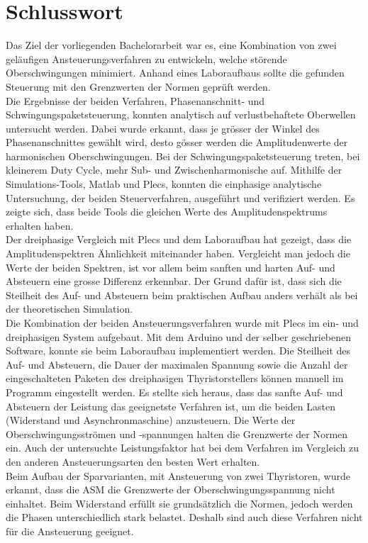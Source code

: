 \section{Schlusswort}
Das Ziel der vorliegenden Bachelorarbeit war es, eine Kombination von zwei geläufigen Ansteuerungsverfahren zu entwickeln, welche störende Oberschwingungen minimiert. Anhand eines Laboraufbaus sollte die gefunden Steuerung mit den Grenzwerten der Normen geprüft werden.\\ 
Die Ergebnisse der beiden Verfahren, Phasenanschnitt- und Schwingungspaketsteuerung, konnten analytisch auf verlustbehaftete Oberwellen untersucht werden. Dabei wurde erkannt, dass je grösser der Winkel des Phasenanschnittes gewählt wird, desto gösser werden die Amplitudenwerte der harmonischen Oberschwingungen. Bei der Schwingungspaketsteuerung treten, bei kleinerem Duty Cycle, mehr Sub- und Zwischenharmonische auf. Mithilfe der Simulations-Tools, Matlab und Plecs, konnten die einphasige analytische Untersuchung, der beiden Steuerverfahren, ausgeführt und verifiziert werden. Es zeigte sich, dass beide Tools die gleichen Werte des Amplitudenspektrums erhalten haben.\\ 
Der dreiphasige Vergleich mit Plecs und dem Laboraufbau hat gezeigt, dass die Amplitudenspektren Ähnlichkeit miteinander haben. Vergleicht man jedoch die Werte der beiden Spektren, ist vor allem beim sanften und harten Auf- und Absteuern eine grosse Differenz erkennbar. Der Grund dafür ist, dass sich die Steilheit des Auf- und Absteuern beim praktischen Aufbau anders verhält als bei der theoretischen Simulation.\\
Die Kombination der beiden Ansteuerungsverfahren wurde mit Plecs im ein- und dreiphasigen System aufgebaut. Mit dem Arduino und der selber geschriebenen Software, konnte sie beim Laboraufbau implementiert werden. Die Steilheit des Auf- und Absteuern, die Dauer der maximalen Spannung sowie die Anzahl der eingeschalteten Paketen des dreiphasigen Thyristorstellers können manuell im Programm eingestellt werden. Es stellte sich heraus, dass das sanfte Auf- und Absteuern der Leistung das geeignetste Verfahren ist, um die beiden Lasten (Widerstand und Asynchronmaschine) anzusteuern. Die Werte der Oberschwingungsströmen und -spannungen halten die Grenzwerte der Normen ein. Auch der untersuchte Leistungsfaktor hat bei dem Verfahren im Vergleich zu den anderen Ansteuerungsarten den besten Wert erhalten.\\
Beim Aufbau der Sparvarianten, mit Ansteuerung von zwei Thyristoren, wurde erkannt, dass die ASM die Grenzwerte der Oberschwingungsspannung nicht einhaltet. Beim Widerstand erfüllt sie grundsätzlich die Normen, jedoch werden die Phasen unterschiedlich stark belastet. Deshalb sind auch diese Verfahren nicht für die Ansteuerung geeignet.\\
